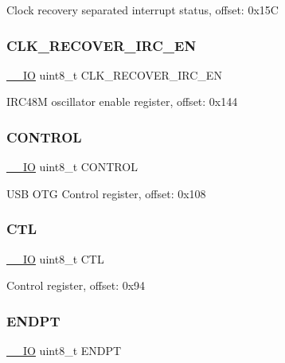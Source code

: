 Clock recovery separated interrupt status, offset\+: 0x15C \mbox{\label{struct_u_s_b___type_a9cd5cd20ce5d7dbf868a7af12fe69b81}} 
\subsubsection{\texorpdfstring{CLK\_RECOVER\_IRC\_EN}{CLK\_RECOVER\_IRC\_EN}}
{\footnotesize\ttfamily \mbox{\hyperlink{core__cm0plus_8h_aec43007d9998a0a0e01faede4133d6be}{\+\_\+\+\_\+\+IO}} uint8\+\_\+t C\+L\+K\+\_\+\+R\+E\+C\+O\+V\+E\+R\+\_\+\+I\+R\+C\+\_\+\+EN}

I\+R\+C48M oscillator enable register, offset\+: 0x144 \mbox{\label{struct_u_s_b___type_ad042c540de71ddbe331a097886f11579}} 
\subsubsection{\texorpdfstring{CONTROL}{CONTROL}}
{\footnotesize\ttfamily \mbox{\hyperlink{core__cm0plus_8h_aec43007d9998a0a0e01faede4133d6be}{\+\_\+\+\_\+\+IO}} uint8\+\_\+t C\+O\+N\+T\+R\+OL}

U\+SB O\+TG Control register, offset\+: 0x108 \mbox{\label{struct_u_s_b___type_acb7581e8a603234f71f2e32a3f5463c5}} 
\subsubsection{\texorpdfstring{CTL}{CTL}}
{\footnotesize\ttfamily \mbox{\hyperlink{core__cm0plus_8h_aec43007d9998a0a0e01faede4133d6be}{\+\_\+\+\_\+\+IO}} uint8\+\_\+t C\+TL}

Control register, offset\+: 0x94 \mbox{\label{struct_u_s_b___type_ad696ad5082cb8aef65756299d5eb897e}} 
\subsubsection{\texorpdfstring{ENDPT}{ENDPT}}
{\footnotesize\ttfamily \mbox{\hyperlink{core__cm0plus_8h_aec43007d9998a0a0e01faede4133d6be}{\+\_\+\+\_\+\+IO}} uint8\+\_\+t E\+N\+D\+PT}

